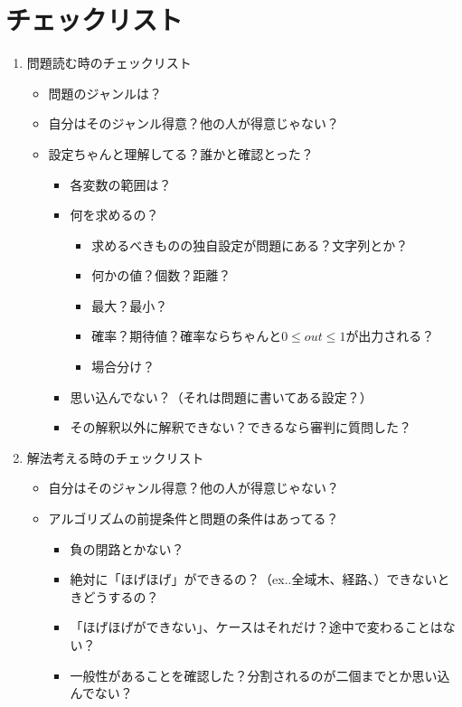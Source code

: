 \documentclass{jsarticle}
\begin{document}
\section{チェックリスト}
\begin{enumerate}
  \item 問題読む時のチェックリスト
  \begin{itemize}
    \item 問題のジャンルは？
    \item 自分はそのジャンル得意？他の人が得意じゃない？
    \item 設定ちゃんと理解してる？誰かと確認とった？
    \begin{itemize}
      \item 各変数の範囲は？
      \item 何を求めるの？
      \begin{itemize}
        \item 求めるべきものの独自設定が問題にある？文字列とか？
        \item 何かの値？個数？距離？
        \item 最大？最小？
        \item 確率？期待値？確率ならちゃんと$0\leq out\leq 1$が出力される？
        \item 場合分け？
      \end{itemize}
      \item 思い込んでない？（それは問題に書いてある設定？）
      \item その解釈以外に解釈できない？できるなら審判に質問した？
    \end{itemize}
  \end{itemize}
  \clearpage
  \item 解法考える時のチェックリスト
  \begin{itemize}
    \item 自分はそのジャンル得意？他の人が得意じゃない？
    \item アルゴリズムの前提条件と問題の条件はあってる？
    \begin{itemize}
      \item 負の閉路とかない？
      \item 絶対に「ほげほげ」ができるの？（ex..全域木、経路、）できないときどうするの？
      \item 「ほげほげができない」、ケースはそれだけ？途中で変わることはない？
      \item  一般性があることを確認した？分割されるのが二個までとか思い込んでない？
    \end{itemize}

\end{itemize}
\end{enumerate}
\end{document}
